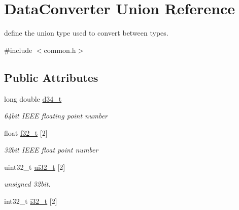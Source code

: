 \hypertarget{union_data_converter}{\section{Data\-Converter Union Reference}
\label{union_data_converter}
}


define the union type used to convert between types.  




{\ttfamily \#include $<$common.\-h$>$}

\subsection*{Public Attributes}
\begin{DoxyCompactItemize}
\item 
\hypertarget{union_data_converter_ae9dce194bf800c0ea89942da406dc525}{long double \hyperlink{union_data_converter_ae9dce194bf800c0ea89942da406dc525}{d34\-\_\-t}}\label{union_data_converter_ae9dce194bf800c0ea89942da406dc525}

\begin{DoxyCompactList}\small\item\em 64bit I\-E\-E\-E floating point number \end{DoxyCompactList}\item 
\hypertarget{union_data_converter_ac99b9f7c8af24916e3b7993c1928b4f2}{float \hyperlink{union_data_converter_ac99b9f7c8af24916e3b7993c1928b4f2}{f32\-\_\-t} \mbox{[}2\mbox{]}}\label{union_data_converter_ac99b9f7c8af24916e3b7993c1928b4f2}

\begin{DoxyCompactList}\small\item\em 32bit I\-E\-E\-E float point number \end{DoxyCompactList}\item 
\hypertarget{union_data_converter_a20845be2f89b1012e3942dca4c5fa117}{uint32\-\_\-t \hyperlink{union_data_converter_a20845be2f89b1012e3942dca4c5fa117}{ui32\-\_\-t} \mbox{[}2\mbox{]}}\label{union_data_converter_a20845be2f89b1012e3942dca4c5fa117}

\begin{DoxyCompactList}\small\item\em unsigned 32bit. \end{DoxyCompactList}\item 
\hypertarget{union_data_converter_a0cf5f8f2f3ba3f3e1a1c44a21248d910}{int32\-\_\-t \hyperlink{union_data_converter_a0cf5f8f2f3ba3f3e1a1c44a21248d910}{i32\-\_\-t} \mbox{[}2\mbox{]}}\label{union_data_converter_a0cf5f8f2f3ba3f3e1a1c44a21248d910}


\end{DoxyCompactItemize}
